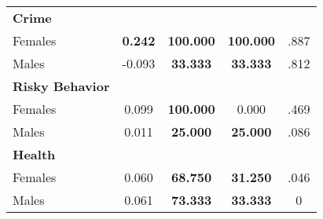\begin{tabular}{l c c c c}
\midrule
\textbf{Crime} & & & & \\
\quad Females &  \textbf{    0.242} & \textbf{  100.000} & \textbf{  100.000} & .887 \\
\quad Males &     -0.093 & \textbf{   33.333} & \textbf{   33.333} & .812 \\
\midrule
\textbf{Risky Behavior} & & & & \\
\quad Females &      0.099 & \textbf{  100.000} &     0.000 & .469 \\
\quad Males &      0.011 & \textbf{   25.000} & \textbf{   25.000} & .086 \\
\midrule
\textbf{Health} & & & & \\
\quad Females &      0.060 & \textbf{   68.750} & \textbf{   31.250} & .046 \\
\quad Males &      0.061 & \textbf{   73.333} & \textbf{   33.333} & 0 \\
\bottomrule
\end{tabular}
